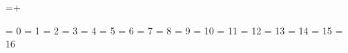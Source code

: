 


\unprotect


\long{}

\beginETEX
  \mathchardef\etexversion=\numexpr{}+\expandafter\gobbleoneargument\eTeXrevision\relax
\endETEX

\beginTEX
  \mathchardef{}
\endTEX


\chardef\@@bottomlevelgroup   =  0
\chardef\@@simplegroup        =  1
\chardef\@@hboxgroup          =  2
\chardef\@@adjustedhboxgroup  =  3
\chardef\@@vboxgroup          =  4
\chardef\@@vtopgroup          =  5
\chardef\@@aligngroup         =  6
\chardef\@@noaligngroup       =  7
\chardef\@@outputgroup        =  8
\chardef\@@mathgroup          =  9
\chardef\@@discretionarygroup = 10
\chardef\@@insertgroup        = 11
\chardef\@@vcentergroup       = 12
\chardef\@@mathchoicegroup    = 13
\chardef\@@semisimplegroup    = 14
\chardef\@@mathshiftgroup     = 15
\chardef\@@mathleftgroup      = 16

